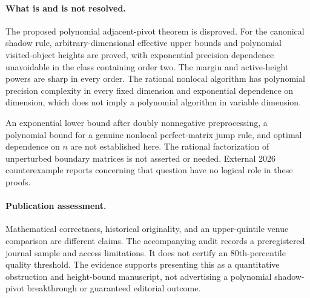 \documentclass[11pt]{article}
\theoremstyle{remark}\newtheorem{remark}[theorem]{Remark}
\begin{document}
\paragraph{What is and is not resolved.}
The proposed polynomial adjacent-pivot theorem is disproved. For the canonical shadow rule, arbitrary-dimensional effective upper bounds and polynomial visited-object heights are proved, with exponential precision dependence unavoidable in the class containing order two. The margin and active-height powers are sharp in every order. The rational nonlocal algorithm has polynomial precision complexity in every fixed dimension and exponential dependence on dimension, which does not imply a polynomial algorithm in variable dimension.

An exponential lower bound after doubly nonnegative preprocessing, a polynomial bound for a genuine nonlocal perfect-matrix jump rule, and optimal dependence on $n$ are not established here. The rational factorization of unperturbed boundary matrices is not asserted or needed. External 2026 counterexample reports concerning that question have no logical role in these proofs.

\paragraph{Publication assessment.}
Mathematical correctness, historical originality, and an upper-quintile venue comparison are different claims. The accompanying audit records a preregistered journal sample and access limitations. It does not certify an 80th-percentile quality threshold. The evidence supports presenting this as a quantitative obstruction and height-bound manuscript, not advertising a polynomial shadow-pivot breakthrough or guaranteed editorial outcome.
\end{document}
